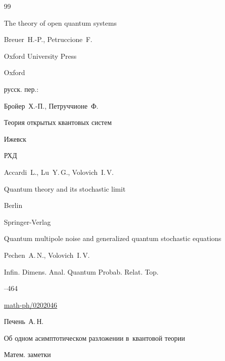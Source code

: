 \begin{thebibliography}{99}




\book The theory of open quantum systems 

\by Breuer~H.-P.,  Petruccione~F.

\publ Oxford University Press

\publaddr Oxford



\rtransl русск. пер.:~

\by Бройер~Х.-П., Петруччионе~Ф.

\book Теория открытых квантовых систем

\publaddr Ижевск

\publ РХД






\by Accardi~L., Lu~Y.\,G., Volovich~I.\,V.

\book Quantum theory and its stochastic limit

\publaddr Berlin

\publ Sprin\-ger-Verlag






\paper Quantum multipole noise and generalized quantum stochastic equations

\by Pechen~A.\,N., Volovich~I.\,V.

\jour Infin. Dimens. Anal. Quantum Probab. Relat. Top.




--464

\arxiv 	\href{http://arxiv.org/abs/math-ph/0202046}{math-ph/0202046}








\by    Печень~А.\,Н.

\paper Об одном асимптотическом разложении в~квантовой теории

\jour Матем. заметки


\end{thebibliography}
